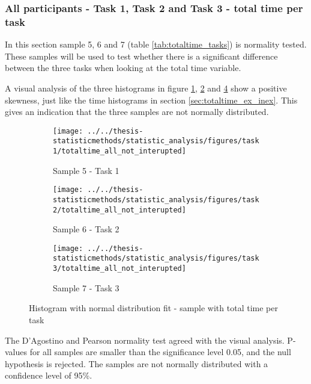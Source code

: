 \subsubsection[Sample 5, 6 and 7]{All participants - Task 1, Task 2 and Task 3 - total time per task}\label{sec:task123_time_normaltest}

In this section sample 5, 6 and 7 (table \ref{tab:totaltime_tasks}) is normality tested. These samples will be used to test whether there is a significant difference between the three tasks when looking at the total time variable. 

A visual analysis of the three histograms in figure \ref{fig:totaltimeallnotinterupted_task1}, \ref{fig:totaltimeallnotinterupted_task2} and \ref{fig:totaltimeallnotinterupted_task3} show a positive skewness, just like the time histograms in section \ref{sec:totaltime_ex_inex}. This gives an indication that the three samples are not normally distributed. 

\begin{figure}[h!]
	\centering
	\begin{subfigure}[b]{0.3\textwidth}
		\centering
		\texttt{[image: ../../thesis-statisticmethods/statistic\_analysis/figures/task1/totaltime\_all\_not\_interupted]}
		\caption{Sample 5 - Task 1}
		\label{fig:totaltimeallnotinterupted_task1}
	\end{subfigure}
	\begin{subfigure}[b]{0.3\textwidth}
		\centering
		\texttt{[image: ../../thesis-statisticmethods/statistic\_analysis/figures/task2/totaltime\_all\_not\_interupted]}
		\caption{Sample 6 - Task 2}
		\label{fig:totaltimeallnotinterupted_task2}
	\end{subfigure}
	\begin{subfigure}[b]{0.3\textwidth}
		\centering
		\texttt{[image: ../../thesis-statisticmethods/statistic\_analysis/figures/task3/totaltime\_all\_not\_interupted]}
		\caption{Sample 7 - Task 3}
		\label{fig:totaltimeallnotinterupted_task3}
	\end{subfigure}
	\caption{Histogram with normal distribution fit - sample with total time per task}
\end{figure}

The D'Agostino and Pearson normality test agreed with the visual analysis. P-values for all samples are smaller than the significance level 0.05, and the null hypothesis is rejected. The samples are not normally distributed with a confidence level of 95\%.\\[0.2cm]

